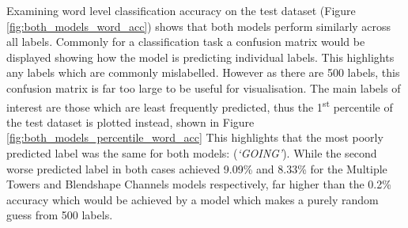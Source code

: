Examining word level classification accuracy on the test dataset (Figure \ref{fig:both_models_word_acc}) shows that both models perform similarly across all labels.
Commonly for a classification task a confusion matrix would be displayed showing how the model is predicting individual labels.
This highlights any labels which are commonly mislabelled.
However as there are 500 labels, this confusion matrix is far too large to be useful for visualisation.
The main labels of interest are those which are least frequently predicted, thus the 1\textsuperscript{st} percentile of the test dataset is plotted instead, shown in Figure \ref{fig:both_models_percentile_word_acc} 
This highlights that the most poorly predicted label was the same for both models: (\textit{`GOING'}).
While the second worse predicted label in both cases achieved 9.09\% and 8.33\% for the Multiple Towers and Blendshape Channels models respectively, far higher than the 0.2\% accuracy which would be achieved by a model which makes a purely random guess from 500 labels.

